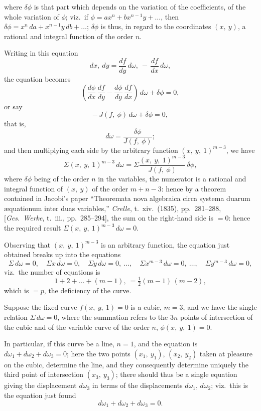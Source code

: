 \documentclass[11pt,a4paper]{article}
\begin{document}
\thispagestyle{plain}
\noindent where $\delta\phi$ is that part which depends on the variation of the coefficients, of the whole variation of $\phi$; viz.\ if $\phi = ax^{n} + bx^{n-1}y + \ldots$, then $\delta\phi = x^{n}\,da + x^{n-1}y\,db + \ldots$; $\delta\phi$ is thus, in regard to the coordinates $(x,\ y)$, a rational and integral function of the order $n$.

\medskip
Writing in this equation
\[
dx,\ dy = \frac{df}{dy}\,d\omega,\ -\,\frac{df}{dx}\,d\omega,
\]
the equation becomes
\[
\left(\frac{d\phi}{dx}\,\frac{df}{dy} - \frac{d\phi}{dy}\,\frac{df}{dx}\right)\,d\omega + \delta\phi = 0,
\]
or say
\[
-\,J(f,\ \phi)\,d\omega + \delta\phi = 0,
\]
that is,
\[
d\omega = \frac{\delta\phi}{J(f,\ \phi)};
\]
and then multiplying each side by the arbitrary function $(x,\ y,\ 1)^{m-3}$, we have
\[
\Sigma(x,\ y,\ 1)^{m-3}\,d\omega = \Sigma\frac{(x,\ y,\ 1)^{m-3}}{J(f,\ \phi)}\,\delta\phi,
\]
where $\delta\phi$ being of the order $n$ in the variables, the numerator is a rational and integral function of $(x,\ y)$ of the order $m + n - 3$: hence by a theorem contained in Jacobi's paper ``Theoremata nova algebraica circa systema duarum \ae quationum inter duas variables,'' \textit{Crelle}, t.~xiv.\ (1835), pp.~281--288, [\textit{Ges.\ Werke}, t.~iii., pp.~285--294], the sum on the right-hand side is $= 0$: hence the required result $\Sigma(x,\ y,\ 1)^{m-3}\,d\omega = 0$.

\medskip
Observing that $(x,\ y,\ 1)^{m-3}$ is an arbitrary function, the equation just obtained breaks up into the equations
\[
\Sigma\,d\omega = 0,\quad \Sigma x\,d\omega = 0,\quad \Sigma y\,d\omega = 0,\ \ldots,\quad \Sigma x^{m-3}\,d\omega = 0,\ \ldots,\quad \Sigma y^{m-3}\,d\omega = 0,
\]
viz.\ the number of equations is
\[
1 + 2 + \ldots + (m - 1),\ = \tfrac{1}{2}(m - 1)\,(m - 2),
\]
which is $= p$, the deficiency of the curve.

\medskip
Suppose the fixed curve $f(x,\ y,\ 1) = 0$ is a cubic, $m = 3$, and we have the single relation $\Sigma\,d\omega = 0$, where the summation refers to the $3n$ points of intersection of the cubic and of the variable curve of the order $n$, $\phi(x,\ y,\ 1) = 0$.

\medskip
In particular, if this curve be a line, $n = 1$, and the equation is $d\omega_{1} + d\omega_{2} + d\omega_{3} = 0$; here the two points $(x_{1},\ y_{1})$, $(x_{2},\ y_{2})$ taken at pleasure on the cubic, determine the line, and they consequently determine uniquely the third point of intersection $(x_{3},\ y_{3})$; there should thus be a single equation giving the displacement $d\omega_{3}$ in terms of the displacements $d\omega_{1}$, $d\omega_{2}$; viz.\ this is the equation just found
\[
d\omega_{1} + d\omega_{2} + d\omega_{3} = 0.
\]
\clearpage
\end{document}
